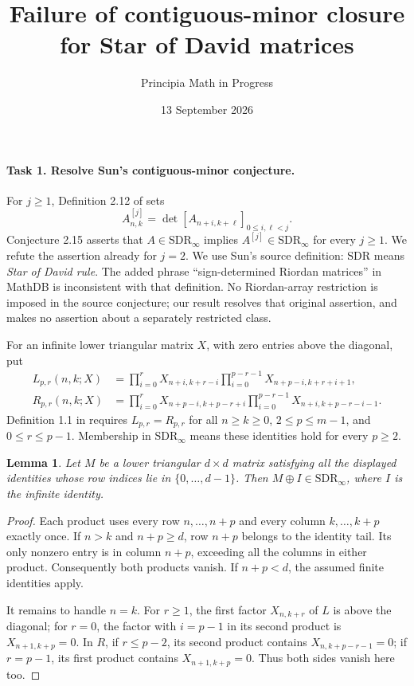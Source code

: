 \documentclass[10pt]{article}
\title{Failure of contiguous-minor closure for Star of David matrices}
\author{Principia Math in Progress}
\date{13 September 2026}
\newtheorem{lemma}{Lemma}
\newcommand{\SDR}{\mathrm{SDR}}
\begin{document}
\maketitle

\paragraph{Task 1. Resolve Sun's contiguous-minor conjecture.}
For \(j\ge1\), Definition 2.12 of \cite{Sun} sets
\[
 A^{[j]}_{n,k}=\det[A_{n+i,k+\ell}]_{0\le i,\ell<j}.
\]
Conjecture 2.15 asserts that \(A\in\SDR_\infty\) implies
\(A^{[j]}\in\SDR_\infty\) for every \(j\ge1\).
We refute the assertion already for \(j=2\).
We use Sun's source definition: \(\SDR\) means \emph{Star of David rule}.
The added phrase ``sign-determined Riordan matrices'' in MathDB is
inconsistent with that definition. No Riordan-array restriction is
imposed in the source conjecture; our result resolves that original
assertion, and makes no assertion about a separately restricted class.

For an infinite lower triangular matrix \(X\), with zero entries above
the diagonal, put
\begin{align*}
 L_{p,r}(n,k;X)&=
 \prod_{i=0}^{r}X_{n+i,k+r-i}
 \prod_{i=0}^{p-r-1}X_{n+p-i,k+r+i+1},\\
 R_{p,r}(n,k;X)&=
 \prod_{i=0}^{r}X_{n+p-i,k+p-r+i}
 \prod_{i=0}^{p-r-1}X_{n+i,k+p-r-i-1}.
\end{align*}
Definition 1.1 in \cite{Sun} requires \(L_{p,r}=R_{p,r}\) for all
\(n\ge k\ge0\), \(2\le p\le m-1\), and \(0\le r\le p-1\).
Membership in \(\SDR_\infty\) means these identities hold for every
\(p\ge2\).

\begin{lemma}\label{extension}
Let \(M\) be a lower triangular \(d\times d\) matrix satisfying all
the displayed identities whose row indices lie in \(\{0,\ldots,d-1\}\).
Then \(M\oplus I\in\SDR_\infty\), where \(I\) is the infinite identity.
\end{lemma}
\begin{proof}
Each product uses every row \(n,\ldots,n+p\) and every column
\(k,\ldots,k+p\) exactly once. If \(n>k\) and \(n+p\ge d\),
row \(n+p\) belongs to the identity tail. Its only nonzero entry is
in column \(n+p\), exceeding all the columns in either product.
Consequently both products vanish. If \(n+p<d\), the assumed
finite identities apply.

It remains to handle \(n=k\). For \(r\ge1\), the first factor
\(X_{n,k+r}\) of \(L\) is above the diagonal; for \(r=0\),
the factor with \(i=p-1\) in its second product is
\(X_{n+1,k+p}=0\). In \(R\), if \(r\le p-2\), its second
product contains \(X_{n,k+p-r-1}=0\); if \(r=p-1\), its first
product contains \(X_{n+1,k+p}=0\). Thus both sides vanish here too.
\end{proof}
\end{document}
